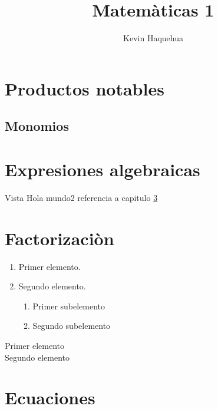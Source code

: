 \documentclass{book}
\title{Matemàticas 1}
\author{Kevin Haquehua}
\begin{document}
\frontmatter

\maketitle %

\chapter{Productos notables}

\section{Monomios}
\lipsum[1-2]

\tableofcontents
\mainmatter

\chapter{Expresiones algebraicas}

Vista
Hola mundo2 referencia a capitulo \ref{chap:factorizacion} 

\chapter{Factorizaciòn}
\label{chap:factorizacion}

\marginpar{\lipsum[1]}

\begin{enumerate}
  \item Primer elemento.
  \item Segundo elemento.
    \begin{enumerate}
      \item Primer subelemento
      \item Segundo subelemento
    \end{enumerate}
\end{enumerate}

\begin{description}
  \item[Primer elemento] \lipsum[1]
  \item[Segundo elemento] \lipsum[1] 
\end{description}

\lipsum[1-5]

\chapter{Ecuaciones}

\textbf{\lipsum[1]} 

\backmatter

\appendix


\end{document}

